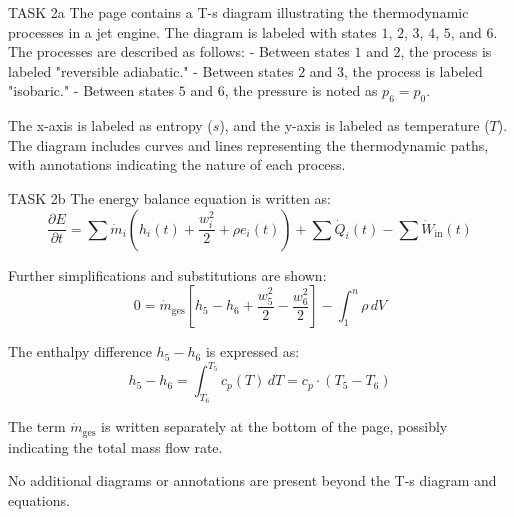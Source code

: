 TASK 2a  
The page contains a T-s diagram illustrating the thermodynamic processes in a jet engine. The diagram is labeled with states \(1\), \(2\), \(3\), \(4\), \(5\), and \(6\). The processes are described as follows:  
- Between states \(1\) and \(2\), the process is labeled "reversible adiabatic."  
- Between states \(2\) and \(3\), the process is labeled "isobaric."  
- Between states \(5\) and \(6\), the pressure is noted as \(p_6 = p_0\).  

The x-axis is labeled as entropy (\(s\)), and the y-axis is labeled as temperature (\(T\)). The diagram includes curves and lines representing the thermodynamic paths, with annotations indicating the nature of each process.  

TASK 2b  
The energy balance equation is written as:  
\[
\frac{\partial E}{\partial t} = \sum \dot{m}_i \left( h_i(t) + \frac{w_i^2}{2} + \rho e_i(t) \right) + \sum \dot{Q}_i(t) - \sum \dot{W}_\text{in}(t)
\]  

Further simplifications and substitutions are shown:  
\[
0 = \dot{m}_\text{ges} \left[ h_5 - h_6 + \frac{w_5^2}{2} - \frac{w_6^2}{2} \right] - \int_1^n \rho \, dV
\]  

The enthalpy difference \(h_5 - h_6\) is expressed as:  
\[
h_5 - h_6 = \int_{T_6}^{T_5} c_p(T) \, dT = c_p \cdot (T_5 - T_6)
\]  

The term \(\dot{m}_\text{ges}\) is written separately at the bottom of the page, possibly indicating the total mass flow rate.  

No additional diagrams or annotations are present beyond the T-s diagram and equations.